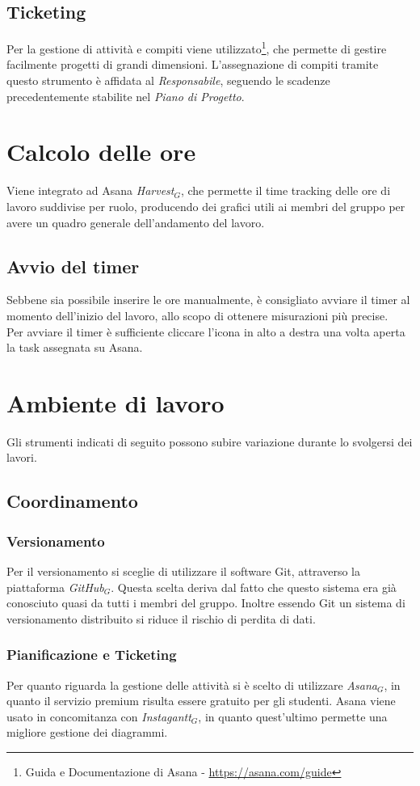 \subsection{Ticketing}
Per la gestione di attività e compiti viene utilizzato\footnote{Guida e Documentazione di Asana - \url{https://asana.com/guide}}, che permette di gestire facilmente progetti di grandi dimensioni.
L'assegnazione di compiti tramite questo strumento è affidata al \textit{Responsabile}, seguendo le scadenze precedentemente stabilite nel \textit{Piano di Progetto}.

\section{Calcolo delle ore} \label{calcoloOre}
Viene integrato ad Asana \textit{Harvest$_{G}$}, che permette il time tracking delle ore di lavoro suddivise per ruolo, producendo dei grafici utili ai membri del gruppo per avere un quadro generale dell'andamento del lavoro.
\subsection{Avvio del timer}
Sebbene sia possibile inserire le ore manualmente, è consigliato avviare il timer al momento dell'inizio del lavoro, allo scopo di ottenere misurazioni più precise.\\
Per avviare il timer è sufficiente cliccare l'icona in alto a destra una volta aperta la task assegnata su Asana.

\section{Ambiente di lavoro}
Gli strumenti indicati di seguito possono subire variazione durante lo svolgersi dei lavori.
\subsection{Coordinamento}
\subsubsection{Versionamento}
Per il versionamento si sceglie di utilizzare il software Git, attraverso la piattaforma \textit{GitHub$_{G}$}. Questa scelta deriva dal fatto che questo sistema era già conosciuto quasi da tutti i membri del gruppo. Inoltre essendo Git un sistema di versionamento distribuito si riduce il rischio di perdita di dati. 
\subsubsection{Pianificazione e Ticketing}
Per quanto riguarda la gestione delle attività si è scelto di utilizzare \textit{Asana$_{G}$}, in quanto il servizio premium risulta essere gratuito per gli studenti. Asana viene usato in concomitanza con \textit{Instagantt$_{G}$}, in quanto quest'ultimo permette una migliore gestione dei diagrammi.
